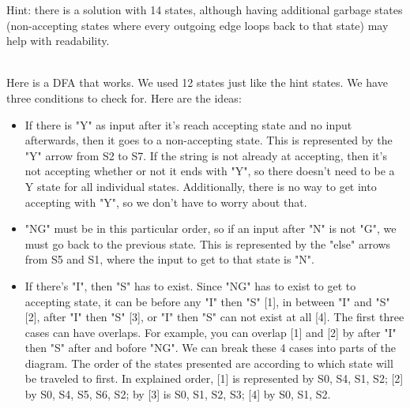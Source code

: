   Hint: there is a solution with 14 states, although having additional garbage states (non-accepting states where every outgoing edge loops back to that state) may help with readability.
  \\{\color{NavyBlue}
  \\ Here is a DFA that works. We used 12 states just like the hint states. We have three conditions to check for. Here are the ideas:
  
\begin{itemize}
  \item  If there is "Y" as input after it's reach accepting state and no input afterwards, then it goes to a non-accepting state. This is represented by the "Y" arrow from S2 to S7. If the string is not already at accepting, then it's not accepting whether or not it ends with "Y", so there doesn't need to be a Y state for all individual states. Additionally, there is no way to get into accepting with "Y", so we don't have to worry about that.
  \item "NG" must be in this particular order, so if an input after "N" is not "G", we must go back to the previous state. This is represented by the "else" arrows from S5 and S1, where the input to get to that state is "N". 
  \item If there's "I", then "S" has to exist. Since "NG" has to exist to get to accepting state, it can be before any "I" then "S" [1], in between "I" and "S" [2], after "I" then "S" [3], or "I" then "S" can not exist at all [4]. The first three cases can have overlaps. For example, you can overlap [1] and [2] by after "I" then "S" after and bofore "NG". We can break these 4 cases into parts of the diagram. The order of the states presented are according to which state will be traveled to first. In explained order, [1] is represented by S0, S4, S1, S2; [2] by S0, S4, S5, S6, S2; by [3] is S0, S1, S2, S3; [4] by S0, S1, S2.
  \end{itemize}
  \\
  }

